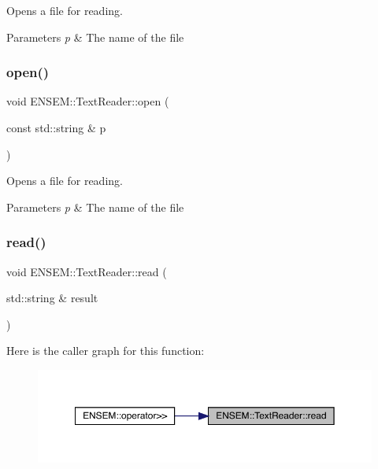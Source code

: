 Opens a file for reading. 


\begin{DoxyParams}{Parameters}
{\em p} & The name of the file \\
\hline
\end{DoxyParams}
\mbox{\label{classENSEM_1_1TextReader_a167e412dc7a3a56fae35ccb4cc9d9029}} 
\subsubsection{\texorpdfstring{open()}{open()}\hspace{0.1cm}{\footnotesize\ttfamily [2/2]}}
{\footnotesize\ttfamily void E\+N\+S\+E\+M\+::\+Text\+Reader\+::open (\begin{DoxyParamCaption}\item[{const std\+::string \&}]{p }\end{DoxyParamCaption})}



Opens a file for reading. 


\begin{DoxyParams}{Parameters}
{\em p} & The name of the file \\
\hline
\end{DoxyParams}
\mbox{\label{classENSEM_1_1TextReader_acbeb934e3316e4cf0c74d23dbe473d19}} 
\subsubsection{\texorpdfstring{read()}{read()}\hspace{0.1cm}{\footnotesize\ttfamily [1/22]}}
{\footnotesize\ttfamily void E\+N\+S\+E\+M\+::\+Text\+Reader\+::read (\begin{DoxyParamCaption}\item[{std\+::string \&}]{result }\end{DoxyParamCaption})}

Here is the caller graph for this function\+:\nopagebreak
\begin{figure}[H]
\begin{center}
\leavevmode
\includegraphics[width=350pt]{d4/d23/classENSEM_1_1TextReader_acbeb934e3316e4cf0c74d23dbe473d19_icgraph}
\end{center}
\end{figure}
\mbox{\label{classENSEM_1_1TextReader_acbeb934e3316e4cf0c74d23dbe473d19}} 
